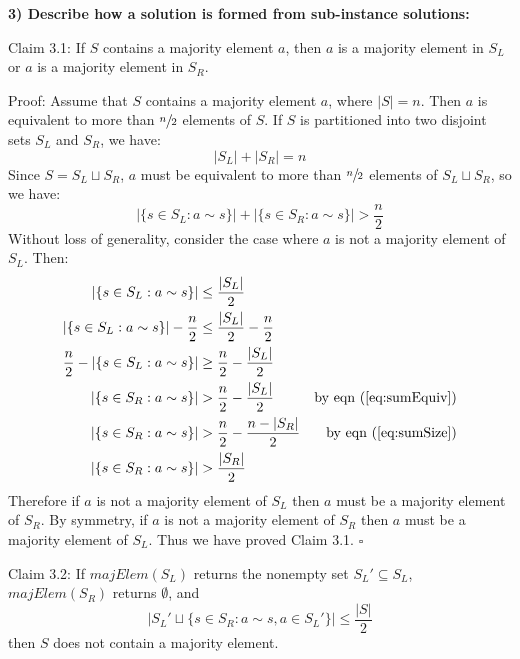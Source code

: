 \documentclass{article}
\begin{document}
\textbf{3) Describe how a solution is formed from sub-instance solutions:}

Claim 3.1: If $S$ contains a majority element $a$, then $a$ is a majority
element in $S_L$ or $a$ is a majority element in $S_R$.

Proof: Assume that $S$ contains a majority element $a$, where $|S|=n$. Then
$a$ is equivalent to more than $\sfrac{n}{2}$ elements of $S$. If $S$ is
partitioned into
two disjoint sets $S_L$ and $S_R$, we have:
\begin{equation}
\label{eq:sumSize}
|S_L|+|S_R|=n
\end{equation}
Since $S = S_L \sqcup S_R$, $a$ must be equivalent to more than $\sfrac{n}{2}$
elements
of $S_L \sqcup S_R$, so we have:
\begin{equation}
\label{eq:sumEquiv}
|\{s \in S_L : a \sim s\}| + |\{s \in S_R : a \sim s\}| > \frac{n}{2}
\end{equation}
Without loss of generality, consider the case where $a$ is not a majority
element of $S_L$. Then:
\begin{align*}
|\{s \in S_L : a \sim s\}| &\leq \frac{|S_L|}{2} \\
|\{s \in S_L : a \sim s\}| - \frac{n}{2} &\leq \frac{|S_L|}{2} - \frac{n}{2} \\
\frac{n}{2} - |\{s \in S_L : a \sim s\}| &\geq \frac{n}{2} - \frac{|S_L|}{2} \\
|\{s \in S_R : a \sim s\}| &> \frac{n}{2} - \frac{|S_L|}{2}
&\text{by eqn (\ref{eq:sumEquiv})} \\
|\{s \in S_R : a \sim s\}| &> \frac{n}{2} - \frac{n-|S_R|}{2}
&\text{by eqn (\ref{eq:sumSize})} \\
|\{s \in S_R : a \sim s\}| &> \frac{|S_R|}{2}
\end{align*}
Therefore if $a$ is not a majority element of $S_L$ then $a$ must be a majority
element of $S_R$. By symmetry, if $a$ is not a majority element of $S_R$ then
$a$ must be a majority element of $S_L$. Thus we have proved Claim 3.1.
$\square$

Claim 3.2: If $majElem(S_L)$ returns the nonempty set $S_L' \subseteq S_L$,
$majElem(S_R)$ returns $\emptyset$, and
\begin{equation}
\label{eq:notMaj}
|S_L' \sqcup \{s \in S_R : a \sim s, a \in S_L'\}| \leq \frac{|S|}{2}
\end{equation}
then $S$ does not contain a majority element.
\end{document}
